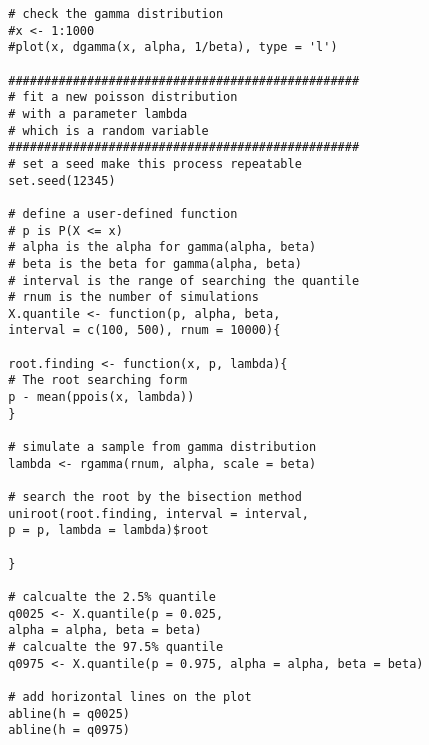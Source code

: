\begin{enumerate}
\begin{verbatim}
		# check the gamma distribution
		#x <- 1:1000 
		#plot(x, dgamma(x, alpha, 1/beta), type = 'l')
		
		#################################################
		# fit a new poisson distribution 
		# with a parameter lambda 
		# which is a random variable
		#################################################
		# set a seed make this process repeatable
		set.seed(12345)
		
		# define a user-defined function
		# p is P(X <= x)
		# alpha is the alpha for gamma(alpha, beta)
		# beta is the beta for gamma(alpha, beta)
		# interval is the range of searching the quantile
		# rnum is the number of simulations
		X.quantile <- function(p, alpha, beta, 
		interval = c(100, 500), rnum = 10000){
		
		root.finding <- function(x, p, lambda){
		# The root searching form
		p - mean(ppois(x, lambda))
		}
		
		# simulate a sample from gamma distribution
		lambda <- rgamma(rnum, alpha, scale = beta)
		
		# search the root by the bisection method
		uniroot(root.finding, interval = interval, 
		p = p, lambda = lambda)$root
		
		}
		
		# calcualte the 2.5% quantile
		q0025 <- X.quantile(p = 0.025, 
		alpha = alpha, beta = beta)
		# calcualte the 97.5% quantile
		q0975 <- X.quantile(p = 0.975, alpha = alpha, beta = beta)
		
		# add horizontal lines on the plot
		abline(h = q0025)
		abline(h = q0975)
	\end{verbatim}
\end{enumerate}
